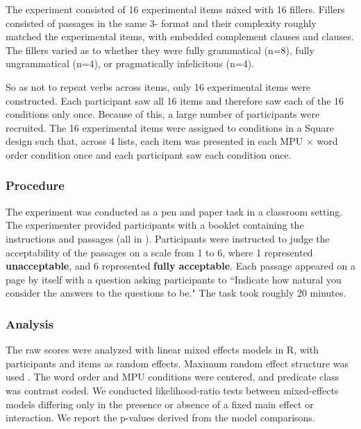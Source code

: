 \documentclass[output=paper]{langsci/langscibook}
\begin{document}
The experiment consisted of 16 experimental items mixed with 16 fillers. Fillers consisted of passages in the same 3- format and their complexity roughly matched the experimental items, with embedded complement clauses and  clauses. The fillers varied as to whether they were fully grammatical (n=8), fully ungrammatical (n=4), or pragmatically infelicitous (n=4).  

So as not to repeat verbs across items, only 16 experimental items were constructed.  Each participant saw all 16 items and therefore saw each of the 16 conditions only once.  Because of this, a large number of participants were recruited.  The 16 experimental items were assigned to conditions in a  Square design such that, across 4 lists, each item was presented in each MPU $\times$ word order condition once and each participant saw each condition once.

\subsubsection{Procedure}

The experiment was conducted as a pen and paper task in a classroom setting.
The experimenter provided participants with a booklet containing the
instructions and passages (all in ).  Participants were instructed to
judge the acceptability of the passages on a scale from 1 to 6, where 1
represented \textbf{unacceptable}, and 6 represented \textbf{fully acceptable}.
Each passage appeared on a page by itself with a {question} asking participants to ``Indicate how natural you consider the answers to the questions to be."  The task took roughly 20 minutes.

\subsubsection{Analysis}


The raw scores were analyzed with linear mixed effects models in R, with
participants and items as random effects.  Maximum random effect structure was
used \citep{BarrEtAl2013}.  The word order and MPU conditions were centered, and 
predicate class was contrast coded.  We conducted likelihood-ratio tests
between mixed-effects models differing only in the presence or absence of a
fixed main effect or interaction.  We report the p-values derived from the model
comparisons.
\end{document}
